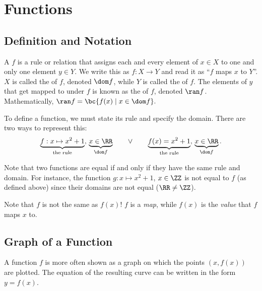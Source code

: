 \chapter{Functions}

\section{Definition and Notation}

\begin{definition}
    A  $f$ is a rule or relation that assigns each and every element of $x \in X$ to one and only one element $y \in Y$. We write this as $f : X \to Y$ and read it as ``$f$ maps $x$ to $Y$''. $X$ is called the  of $f$, denoted $\dom f$, while $Y$ is called the  of $f$. The elements of $y$ that get mapped to under $f$ is known as the  of $f$, denoted $\ran f$. Mathematically, $\ran f = \bc{f(x) \mid x \in \dom f}.$
\end{definition}

To define a function, we must state its rule and specify the domain. There are two ways to represent this: \[\underbrace{f : x \mapsto x^2 + 1}_{\text{the rule}}, \, \underbrace{x \in \RR}_{\dom f} \qquad \lor \qquad \underbrace{f(x) = x^2 + 1}_{\text{the rule}}, \, \underbrace{x \in \RR}_{\dom f}.\]

Note that two functions are equal if and only if they have the same rule and domain. For instance, the function $g : x \mapsto x^2 + 1$, $x \in \ZZ$ is not equal to $f$ (as defined above) since their domains are not equal ($\RR \neq \ZZ$).

Note that $f$ is not the same as $f(x)$! $f$ is a \textit{map}, while $f(x)$ is the \textit{value} that $f$ maps $x$ to.

\section{Graph of a Function}

A function $f$ is more often shown as a graph on which the points $(x, f(x))$ are plotted. The equation of the resulting curve can be written in the form $y = f(x)$.

